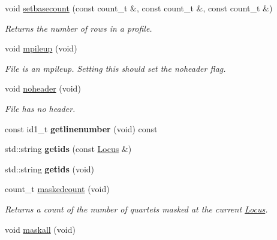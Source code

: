 \begin{DoxyCompactItemize}
\item 
void \hyperlink{classprofile_aa5b384afbc0fc9d014b4b489928ef6e7}{setbasecount} (const count\-\_\-t \&, const count\-\_\-t \&, const count\-\_\-t \&)
\begin{DoxyCompactList}\small\item\em Returns the number of rows in a profile. \end{DoxyCompactList}\item 
\hypertarget{classprofile_a7866bf2ce66d55e69043d04e3105df18}{void \hyperlink{classprofile_a7866bf2ce66d55e69043d04e3105df18}{mpileup} (void)}\label{classprofile_a7866bf2ce66d55e69043d04e3105df18}

\begin{DoxyCompactList}\small\item\em File is an mpileup. Setting this should set the noheader flag. \end{DoxyCompactList}\item 
\hypertarget{classprofile_a0182200bc301248ace0423774d81e41f}{void \hyperlink{classprofile_a0182200bc301248ace0423774d81e41f}{noheader} (void)}\label{classprofile_a0182200bc301248ace0423774d81e41f}

\begin{DoxyCompactList}\small\item\em File has no header. \end{DoxyCompactList}\item 
\hypertarget{classprofile_ab422d592f3d615e882a5adad73a81abc}{const id1\-\_\-t {\bfseries getlinenumber} (void) const }\label{classprofile_ab422d592f3d615e882a5adad73a81abc}

\item 
\hypertarget{classprofile_aff532ee9a518c260d97887bb2d871919}{std\-::string {\bfseries getids} (const \hyperlink{classLocus}{Locus} \&)}\label{classprofile_aff532ee9a518c260d97887bb2d871919}

\item 
\hypertarget{classprofile_a4f382064cda45a1df2a18a86da9aaf76}{std\-::string {\bfseries getids} (void)}\label{classprofile_a4f382064cda45a1df2a18a86da9aaf76}

\item 
\hypertarget{classprofile_af1587eb40e7e3c670d08324c5d95f7c3}{count\-\_\-t \hyperlink{classprofile_af1587eb40e7e3c670d08324c5d95f7c3}{maskedcount} (void)}\label{classprofile_af1587eb40e7e3c670d08324c5d95f7c3}

\begin{DoxyCompactList}\small\item\em Returns a count of the number of quartets masked at the current \hyperlink{classLocus}{Locus}. \end{DoxyCompactList}\item 
\hypertarget{classprofile_a7750f121c26754638453f2d7cd6782d4}{void \hyperlink{classprofile_a7750f121c26754638453f2d7cd6782d4}{maskall} (void)}\label{classprofile_a7750f121c26754638453f2d7cd6782d4}


\end{DoxyCompactItemize}
